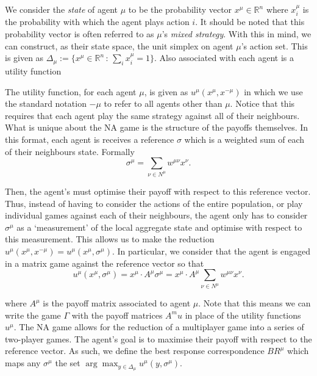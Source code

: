 \documentclass{article}
\theoremstyle{definition}
\newcommand{\utility}[1]{u^{#1}}
\newcommand{\wmunu}{w^{\mu \nu}}
\newcommand{\xmu}{x^{\mu}}
\newcommand{\xnu}{x^{\nu}}
\newcommand{\refmu}{\sigma^{\mu}}
\newcommand{\weightedsum}{ \sum_{\nu \in N^\mu} \wmunu \xnu}
\newcommand{\xnotmu}{x^{-\mu}}
\newcommand{\xmuaction}[1]{x^{\mu}_{#1}}
\begin{document}
  We consider the \emph{state} of agent $\mu$ to be the probability vector $\xmu \in
  \mathbb{R}^n$ where $\xmu_i$ is the probability with which the agent plays action $i$. It
  should be noted that this probability vector is often referred to as $\mu$'s \emph{mixed
  strategy}. With this in mind, we can construct, as their state space, the unit simplex on
  agent $\mu$'s action set. This is given as $\Delta_\mu := \{\xmu \in \mathbb{R}^n \, : \,
  \sum_i \xmuaction{i} = 1\}$. Also associated with each agent is a utility function

  The utility function, for each agent $\mu$, is given as $u^\mu(\xmu, \xnotmu)$ in which we use
  the standard notation $-\mu$ to refer to all agents other than $\mu$. Notice that this requires
  that each agent play the same strategy against all of their neighbours. What is unique about the
  NA game is the structure of the payoffs themselves. In this format, each agent is receives a
  reference $\sigma$ which is a weighted sum of each of their neighbours
  state. Formally
  \begin{equation}
    \sigma^\mu = \sum_{\nu \in N^\mu} \wmunu \xnu.
  \end{equation}

  Then, the agent's must optimise their payoff with respect to this reference vector. Thus,
  instead of having to consider the actions of the entire population, or play individual games
  against each of their neighbours, the agent only has to consider $\sigma^\mu$ as a
  `measurement' of the local aggregate state and optimise with respect to this measurement.
  This allows us to make the reduction $u^\mu(\xmu, \xnotmu) = u^\mu(\xmu, \refmu)$. In
  particular, we consider that the agent is engaged in a matrix game against the
  reference vector so that
  \begin{equation}
    u^\mu(\xmu, \refmu) = \xmu \cdot A^\mu \refmu = \xmu
                \cdot A^\mu \weightedsum.
  \end{equation}

  where $A^\mu$ is the payoff matrix associated to agent $\mu$. Note that this means we can write
  the game $\Gamma$ with the payoff matrices $A^mu$ in place of the utility functions
  $\utility{\mu}$. The NA game allows for the reduction of a multiplayer game into a series of
  two-player games. The agent's goal is to maximise their payoff with respect to the reference
  vector. As such, we define the best response correspondence $BR^\mu$ which maps any $\refmu$
  the set $\arg \max_{y \in \Delta_\mu} {u^\mu(y, \refmu)}$. 
\end{document}
